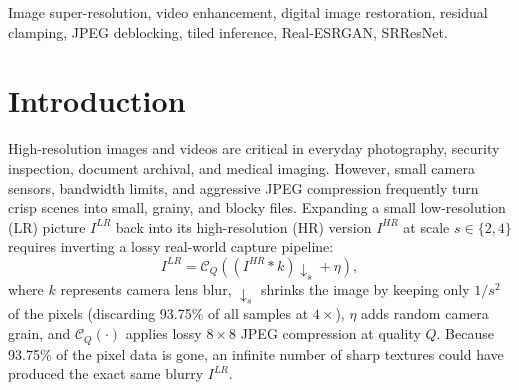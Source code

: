 \documentclass[10pt,onecolumn,journal]{IEEEtran}
\begin{document}
\begin{IEEEkeywords}
Image super-resolution, video enhancement, digital image restoration, residual clamping, JPEG deblocking, tiled inference, Real-ESRGAN, SRResNet.
\end{IEEEkeywords}

\section{Introduction}

High-resolution images and videos are critical in everyday photography, security inspection, document archival, and medical imaging. However, small camera sensors, bandwidth limits, and aggressive JPEG compression frequently turn crisp scenes into small, grainy, and blocky files. Expanding a small low-resolution (LR) picture $I^{LR}$ back into its high-resolution (HR) version $I^{HR}$ at scale $s \in \{2, 4\}$ requires inverting a lossy real-world capture pipeline:
\begin{equation}
I^{LR} = \mathcal{C}_{Q}\!\left( \left(I^{HR} \ast k\right)\downarrow_{s} + \eta \right),
\label{eq:degradation}
\end{equation}
where $k$ represents camera lens blur, $\downarrow_{s}$ shrinks the image by keeping only $1/s^2$ of the pixels (discarding 93.75\% of all samples at $4\times$), $\eta$ adds random camera grain, and $\mathcal{C}_{Q}(\cdot)$ applies lossy $8\times8$ JPEG compression at quality $Q$. Because 93.75\% of the pixel data is gone, an infinite number of sharp textures could have produced the exact same blurry $I^{LR}$.
\end{document}
